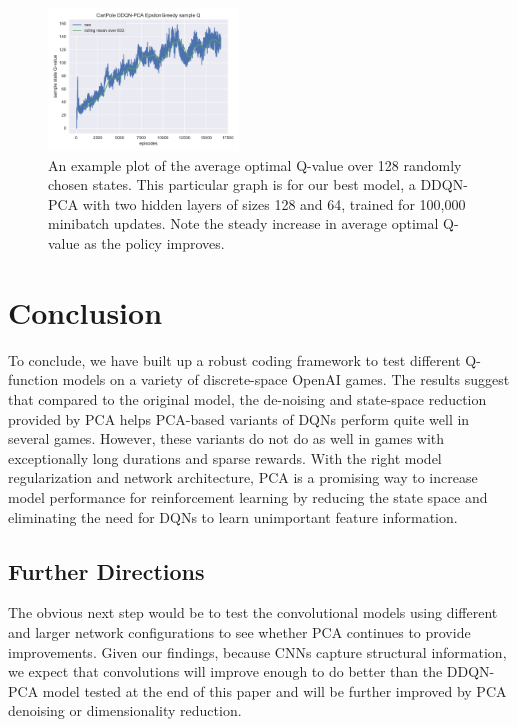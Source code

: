 \documentclass[11pt]{article}
\begin{document}
\begin{figure}
    \centering
    \includegraphics[width=0.45\textwidth]{CartPole/CartPole_DDQN-PCA_EpsilonGreedy_sample_Q_cpu.pdf}
    \caption{An example plot of the average optimal Q-value over 128 randomly chosen states. This particular graph is for our best model, a DDQN-PCA with two hidden layers of sizes 128 and 64, trained for 100,000 minibatch updates. Note the steady increase in average optimal Q-value as the policy improves.}
    \label{fig:sample_Q}
\end{figure}

\section{Conclusion}

To conclude, we have built up a robust coding framework to test different Q-function models on a variety of discrete-space OpenAI games. The results suggest that compared to the original model, the de-noising and state-space reduction provided by PCA helps PCA-based variants of DQNs perform quite well in several games. However, these variants do not do as well in games with exceptionally long durations and sparse rewards. With the right model regularization and network architecture, PCA is a promising way to increase model performance for reinforcement learning by reducing the state space and eliminating the need for DQNs to learn unimportant feature information.

\subsection{Further Directions}

The obvious next step would be to test the convolutional models using different and larger network configurations to see whether PCA continues to provide improvements. Given our findings, because CNNs capture structural information, we expect that convolutions will improve enough to do better than the DDQN-PCA model tested at the end of this paper and will be further improved by PCA denoising or dimensionality reduction.
\end{document}
